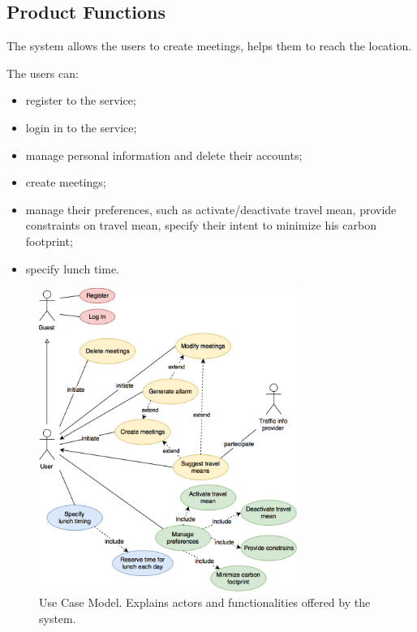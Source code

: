\documentclass{article}
\begin{document}
	
	\subsection{Product Functions}
	The system allows the users to create meetings, helps them to reach the location.
	
	The users can:
	\begin{itemize}
	\item register to the service;
	\item login in to the service;
	\item manage personal information and delete their accounts;
	\item create meetings;
	\item manage their preferences, such as activate/deactivate travel mean, provide constraints on travel mean, specify their intent to minimize his carbon footprint;
	\item specify lunch time.
	\end{itemize}
	
	\bigskip
	\bigskip
	\begin{figure}[htbp]
		\begin{center}
		\includegraphics[width=0.75\textwidth]{img/UseCaseModel.png}
		\caption{Use Case Model. Explains actors and functionalities offered by the system.}
		\label{default}
		\end{center}
	\end{figure}
	
\end{document}
